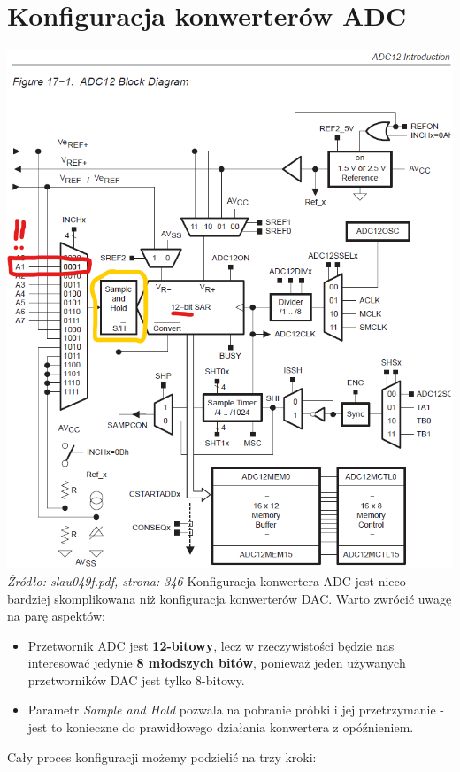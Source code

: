 \documentclass{article}
\begin{document}
\section{Konfiguracja konwerterów ADC}
\includegraphics[width=\textwidth]{"../adc_img/slau049f_346.png"} \\
\textit{Źródło: slau049f.pdf, strona: 346}
\newpage
Konfiguracja konwertera ADC jest nieco bardziej skomplikowana niż konfiguracja konwerterów DAC. Warto zwrócić uwagę na parę aspektów:
\begin{itemize}
    \item Przetwornik ADC jest \textbf{12-bitowy}, lecz w rzeczywistości będzie nas interesować jedynie \textbf{8 młodszych bitów}, ponieważ jeden używanych przetworników DAC jest tylko 8-bitowy.
    \item Parametr \textit{Sample and Hold} pozwala na pobranie próbki i jej przetrzymanie - jest to konieczne do prawidłowego działania konwertera z opóźnieniem.
\end{itemize}
Cały proces konfiguracji możemy podzielić na trzy kroki:
\end{document}

